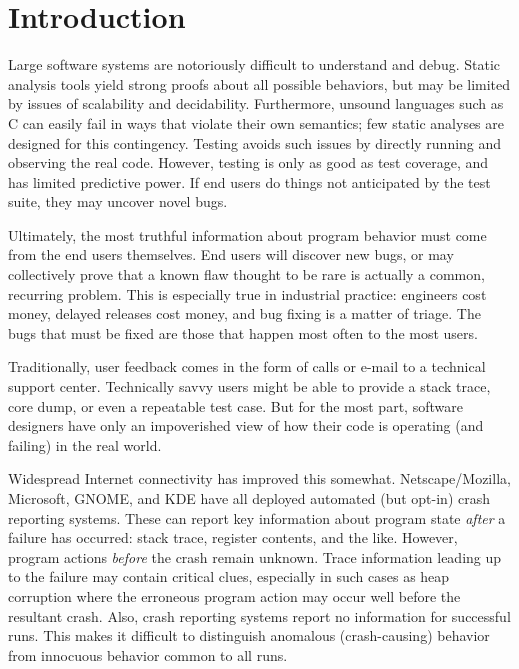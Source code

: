 \section{Introduction}

Large software systems are notoriously difficult to understand and
debug.  Static analysis tools yield strong proofs about all possible
behaviors, but may be limited by issues of scalability and
decidability.  Furthermore, unsound languages such as C can easily
fail in ways that violate their own semantics; few static analyses are
designed for this contingency.  Testing avoids such issues by directly
running and observing the real code.  However, testing is only as good
as test coverage, and has limited predictive power.  If end users do
things not anticipated by the test suite, they may uncover novel bugs.

Ultimately, the most truthful information about program behavior must
come from the end users themselves.  End users will discover new bugs,
or may collectively prove that a known flaw thought to be rare is
actually a common, recurring problem.  This is especially true in
industrial practice: engineers cost money, delayed releases cost
money, and bug fixing is a matter of triage.  The bugs that must be
fixed are those that happen most often to the most users.

Traditionally, user feedback comes in the form of calls or e-mail to a
technical support center.  Technically savvy users might be able to
provide a stack trace, core dump, or even a repeatable test case.  But
for the most part, software designers have only an impoverished view
of how their code is operating (and failing) in the real world.

Widespread Internet connectivity has improved this somewhat.
Netscape/Mozilla, Microsoft, GNOME, and KDE have all deployed
automated (but opt-in) crash reporting systems.  These can report key
information about program state \emph{after} a failure has occurred:
stack trace, register contents, and the like.  However, program
actions \emph{before} the crash remain unknown.  Trace information
leading up to the failure may contain critical clues, especially in
such cases as heap corruption where the erroneous program action may
occur well before the resultant crash.  Also, crash reporting systems
report no information for successful runs.  This makes it difficult to
distinguish anomalous (crash-causing) behavior from innocuous behavior
common to all runs.


